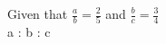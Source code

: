 \documentclass[preview]{standalone}
\begin{document}
\begin{center}
Given that $\frac{a}{b} = \frac{2}{5}$ and $\frac{b}{c} = \frac{3}{4}$\\[0.5cm]  a : b : c
\end{center}
\end{document}
